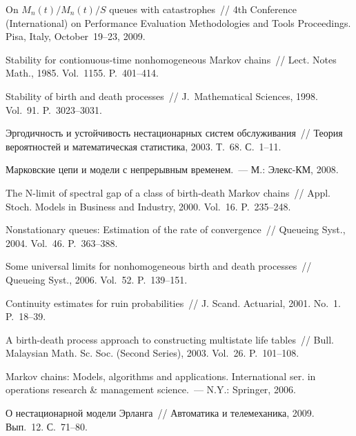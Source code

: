 \begin{multicols}{2}
{{\begin{thebibliography}{99}
On $M_n(t)/M_n(t)/S$ queues with catastrophes~//  4th 
Conference (International) on Performance Evaluation Methodologies and Tools Proceedings.  Pisa, Italy, October~19--23, 2009.

Stability for contionuous-time nonhomogeneous Markov chains~// Lect. Notes Math.,  1985. Vol.~1155. P.~401--414.

Stability of birth and death processes~// J.~Mathematical Sciences, 1998. Vol.~91. P.~3023--3031.


Эргодичность и устойчивость нестационарных систем обслуживания~// 
Теория вероятностей и математическая статистика, 2003. Т.~68. С.~1--11.

Марковские цепи и модели с непрерывным временем.~--- М.: Элекс-КМ, 2008.

The N-limit of spectral gap of a class of birth-death Markov chains~// Appl. Stoch. Models in Business and
Industry, 2000. Vol.~16. P.~235--248.

Nonstationary queues: Estimation of the rate of convergence~// Queueing Syst., 2004.  Vol.~46.  P.~363--388.

Some universal limits for nonhomogeneous birth and death
processes~// Queueing Syst., 2006. Vol.~52. P.~139--151.

Continuity estimates for ruin probabilities~//  J. Scand. Actuarial, 2001. No.~1. P.~18--39.

A birth-death process approach to constructing multistate life tables~// Bull. Malaysian Math. Sc. Soc. (Second Series), 
2003. Vol.~26. P.~101--108.

Markov chains: Models, algorithms and applications. International ser. in operations research \& management
science.~--- N.Y.: Springer,
2006. 

\label{end\stat}

О нестационарной модели Эрланга~// Автоматика и телемеханика, 2009. Вып.~12. С.~71--80.


 \end{thebibliography}
}
}

\end{multicols}